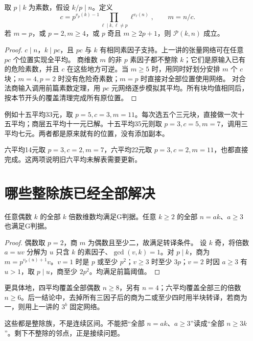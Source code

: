 \begin{theorem}[素数因子转译]\label{thm:factor}
取 $p\mid k$ 为素数，假设 $k/p\mid n$。定义
\[
c=p^{v_p(k)-1}\prod_{\ell\mid k,\ell\ne p}\ell^{v_\ell(n)},\qquad m=n/c.
\]
若 $m=p$，或 $p=2,m\ge4$，或 $p$ 奇且 $m\ge2p+1$，则 $\mathcal P(k,n)$ 成立。
\end{theorem}
\begin{proof}
$c\mid n$，$k\mid pc$，且 $pc$ 与 $k$ 有相同素因子支持。上一讲的张量网络可在任意 $pc$ 个位置实现全平均。
商维数 $m$ 的非 $p$ 素因子都不整除 $k$；它们是原输入已有的危险素数，并且 $c$ 在这些地方可逆。当 $m\ge5$ 时，用同时好划分安排 $m$ 个 $c$ 块；$m=4,p=2$ 时没有危险奇素数；$m=p$ 时直接对全部位置使用网络。
对合法商输入调用前篇素数定理，用 $pc$ 元网络逐步模拟其平均。所有块均值相同后，按本节开头的覆盖清理完成所有原位置。
\end{proof}

例如十五平均33元，取 $p=5,c=3,m=11$。每次选五个三元块，直接做一次十五平均；商层五平均十一元已解。十五平均35元则取 $p=3,c=5,m=7$，调用三平均七元。两者都是原来就有的位置，没有添加副本。

六平均14元取 $p=3,c=2,m=7$，六平均22元取 $p=3,c=2,m=11$，也都直接完成。这两项说明旧六平均未解表需要更新。

\section{哪些整除族已经全部解决}
\begin{corollary}
任意偶数 $k$ 的全部 $k$ 倍数维数均满足G判据。任意 $k\ge2$ 的全部 $n=ak$、$a\ge3$ 也满足G判据。
\end{corollary}
\begin{proof}
偶数取 $p=2$，商 $m$ 为偶数且至少二，故满足转译条件。
设 $k$ 奇，将倍数 $a=uv$ 分解为 $u$ 只含 $k$ 的素因子、$\gcd(v,k)=1$。对 $p\mid k$，商为 $m=p^{v_p(u)+1}v$。$v=1$ 时是 $p$ 或至少 $p^2$；$v\ge3$ 时至少 $3p$；$v=2$ 时因 $a\ge3$ 有 $u>1$，取 $p\mid u$，商至少 $2p^2$。均满足前篇阈值。
\end{proof}
更具体地，四平均覆盖全部偶数 $n\ge8$，另有 $n=4$；六平均覆盖全部三的倍数 $n\ge6$。后一结论中，去掉所有三因子后的商为二或至少四时用半块转译，若商为一，则用上一讲的 $3^b$ 固定网络。

这些都是整除族，不是连续区间。不能把“全部 $n=ak$、$a\ge3$”读成“全部 $n\ge3k$”。剩下不整除的邻点，正是接续问题。
